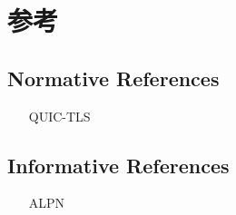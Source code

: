 \section{参考}
\subsection{Normative References}
\begin{itemize}
\item [QUIC-TLS]
  \label{subsec:normative-references:quic-tls}
\end{itemize}

\subsection{Informative References}
\begin{itemize}
\item [ALPN]
  \label{subsec:informative-references:alpn}
\end{itemize}